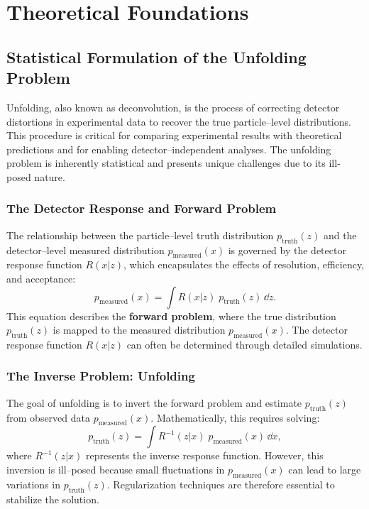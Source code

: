 \chapter{Theoretical Foundations}
\label{chap:theoretical-foundations}
\section{Statistical Formulation of the Unfolding Problem}

Unfolding, also known as deconvolution, is the process of correcting detector distortions in experimental data to recover the true particle--level distributions.
%
This procedure is critical for comparing experimental results with theoretical predictions and for enabling detector--independent analyses.
%
The unfolding problem is inherently statistical and presents unique challenges due to its ill-posed nature.

\subsection{The Detector Response and Forward Problem}

The relationship between the particle--level truth distribution \(p_{\text{truth}}(z)\) and the detector--level measured distribution \(p_{\text{measured}}(x)\) is governed by the detector response function \(R(x|z)\), which encapsulates the effects of resolution, efficiency, and acceptance:
\begin{equation}
    p_{\text{measured}}(x) = \int R(x|z)\; p_{\text{truth}}(z) \, \dd z.
\end{equation}
This equation describes the \textbf{forward problem}, where the true distribution \(p_{\text{truth}}(z)\) is mapped to the measured distribution \(p_{\text{measured}}(x)\). The detector response function \(R(x|z)\) can often be determined through detailed simulations.

\subsection{The Inverse Problem: Unfolding}

The goal of unfolding is to invert the forward problem and estimate \(p_{\text{truth}}(z)\) from observed data \(p_{\text{measured}}(x)\). Mathematically, this requires solving:
\begin{equation}
    p_{\text{truth}}(z) = \int R^{-1}(z|x) \;p_{\text{measured}}(x) \, \dd x,
\end{equation}
where \(R^{-1}(z|x)\) represents the inverse response function.
%
However, this inversion is ill--posed because small fluctuations in \(p_{\text{measured}}(x)\) can lead to large variations in \(p_{\text{truth}}(z)\).
%
Regularization techniques are therefore essential to stabilize the solution.

